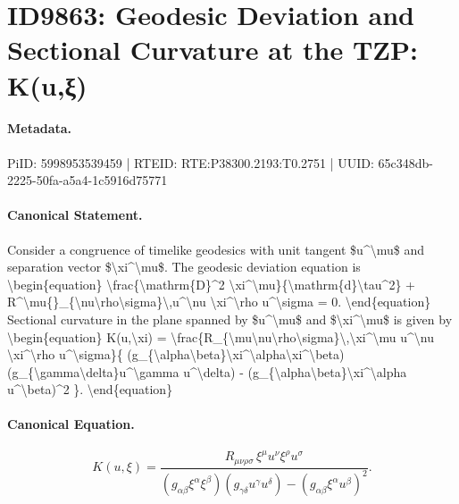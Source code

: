 \section*{ID9863: Geodesic Deviation and Sectional Curvature at the TZP: K(u,ξ)}
\paragraph{Metadata.}
PiID: 5998953539459 | RTEID: RTE:P38300.2193:T0.2751 | UUID: 65c348db-2225-50fa-a5a4-1c5916d75771

\paragraph{Canonical Statement.}
Consider a congruence of timelike geodesics with unit tangent \$u\textasciicircum{}\textbackslash{}mu\$ and separation vector \$\textbackslash{}xi\textasciicircum{}\textbackslash{}mu\$. The geodesic deviation equation is \textbackslash{}begin\{equation\} \textbackslash{}frac\{\textbackslash{}mathrm\{D\}\textasciicircum{}2 \textbackslash{}xi\textasciicircum{}\textbackslash{}mu\}\{\textbackslash{}mathrm\{d\}\textbackslash{}tau\textasciicircum{}2\} + R\textasciicircum{}\textbackslash{}mu\{\}\_\{\textbackslash{}nu\textbackslash{}rho\textbackslash{}sigma\}\textbackslash{},u\textasciicircum{}\textbackslash{}nu \textbackslash{}xi\textasciicircum{}\textbackslash{}rho u\textasciicircum{}\textbackslash{}sigma = 0. \textbackslash{}end\{equation\} Sectional curvature in the plane spanned by \$u\textasciicircum{}\textbackslash{}mu\$ and \$\textbackslash{}xi\textasciicircum{}\textbackslash{}mu\$ is given by \textbackslash{}begin\{equation\} K(u,\textbackslash{}xi) = \textbackslash{}frac\{R\_\{\textbackslash{}mu\textbackslash{}nu\textbackslash{}rho\textbackslash{}sigma\}\textbackslash{},\textbackslash{}xi\textasciicircum{}\textbackslash{}mu u\textasciicircum{}\textbackslash{}nu \textbackslash{}xi\textasciicircum{}\textbackslash{}rho u\textasciicircum{}\textbackslash{}sigma\}\{ (g\_\{\textbackslash{}alpha\textbackslash{}beta\}\textbackslash{}xi\textasciicircum{}\textbackslash{}alpha\textbackslash{}xi\textasciicircum{}\textbackslash{}beta)(g\_\{\textbackslash{}gamma\textbackslash{}delta\}u\textasciicircum{}\textbackslash{}gamma u\textasciicircum{}\textbackslash{}delta) - (g\_\{\textbackslash{}alpha\textbackslash{}beta\}\textbackslash{}xi\textasciicircum{}\textbackslash{}alpha u\textasciicircum{}\textbackslash{}beta)\textasciicircum{}2 \}. \textbackslash{}end\{equation\}

\paragraph{Canonical Equation.}
\[
K(u,\xi) = \frac{R_{\mu\nu\rho\sigma}\,\xi^\mu u^\nu \xi^\rho u^\sigma}{ (g_{\alpha\beta}\xi^\alpha\xi^\beta)(g_{\gamma\delta}u^\gamma u^\delta) - (g_{\alpha\beta}\xi^\alpha u^\beta)^2 }.
\]

